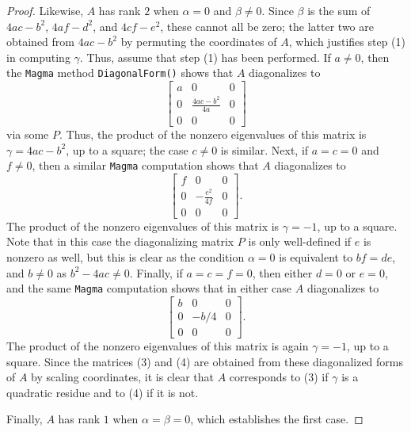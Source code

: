 \documentclass[10pt,a4paper]{amsart}
\numberwithin{equation}{section}
\numberwithin{figure}{section}
\theoremstyle{definition}
\theoremstyle{remark}
\theoremstyle{plain}
\theoremstyle{plain}
\theoremstyle{definition}
\theoremstyle{plain}
\theoremstyle{plain}
\begin{document}
\begin{proof}
Likewise, $A$ has rank $2$ when $\alpha=0$ and $\beta\ne 0$. Since $\beta$ is the sum of $4ac-b^2$, $4af-d^2$, and $4cf-e^2$, these cannot all be zero; the latter two are obtained from $4ac-b^2$ by permuting the coordinates of $A$, which justifies step (1) in computing $\gamma$. Thus, assume that step (1) has been performed. If $a\ne 0$, then the \texttt{Magma} method \texttt{DiagonalForm()} shows that $A$ diagonalizes to
\begin{equation*}
\begin{bmatrix}
a&0&0\\
0&\frac{4ac-b^2}{4a}&0\\
0&0&0
\end{bmatrix}
\end{equation*}
via some $P$. Thus, the product of the nonzero eigenvalues of this matrix is $\gamma=4ac-b^2$, up to a square; the case $c\ne 0$ is similar. Next, if $a=c=0$ and $f\ne 0$, then a similar \texttt{Magma} computation shows that $A$ diagonalizes to
\begin{equation*}
\begin{bmatrix}
f&0&0\\
0&-\frac{e^2}{4f}&0\\
0&0&0
\end{bmatrix}.
\end{equation*}
The product of the nonzero eigenvalues of this matrix is $\gamma=-1$, up to a square. Note that in this case the diagonalizing matrix $P$ is only well-defined if $e$ is nonzero as well, but this is clear as the condition $\alpha=0$ is equivalent to $bf=de$, and $b\ne 0$ as $b^2-4ac\ne 0$. Finally, if $a=c=f=0$, then either $d=0$ or $e=0$, and the same \texttt{Magma} computation shows that in either case $A$ diagonalizes to 
\begin{equation*}
\begin{bmatrix}
b&0&0\\
0&-b/4&0\\
0&0&0
\end{bmatrix}.
\end{equation*}
The product of the nonzero eigenvalues of this matrix is again $\gamma=-1$, up to a square. Since the matrices (3) and (4) are obtained from these diagonalized forms of $A$ by scaling coordinates, it is clear that $A$ corresponds to (3) if $\gamma$ is a quadratic residue and to (4) if it is not.

Finally, $A$ has rank $1$ when $\alpha=\beta=0$, which establishes the first case.
\end{proof}
\end{document}
